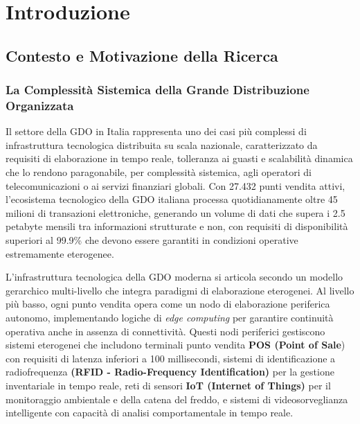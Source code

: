 \chapter{Introduzione}
\label{cap1_introduction}

\section{Contesto e Motivazione della Ricerca}

\subsection{La Complessità Sistemica della Grande Distribuzione Organizzata}

Il settore della \gls{GDO} in Italia rappresenta uno dei casi più complessi di infrastruttura tecnologica distribuita su scala nazionale, caratterizzato da requisiti di elaborazione in tempo reale, tolleranza ai guasti e scalabilità dinamica che lo rendono paragonabile, per complessità sistemica, agli operatori di telecomunicazioni o ai servizi finanziari globali. 
Con 27.432 punti vendita attivi\autocite{istat2024}, l'ecosistema tecnologico della \gls{GDO} italiana processa quotidianamente oltre 45 milioni di transazioni elettroniche, generando un volume di dati che supera i 2.5 petabyte mensili tra informazioni strutturate e non, con requisiti di disponibilità superiori al 99.9\% che devono essere garantiti in condizioni operative estremamente eterogenee.

L'infrastruttura tecnologica della GDO moderna si articola secondo un modello gerarchico multi-livello che integra paradigmi di elaborazione eterogenei. 
Al livello più basso, ogni punto vendita opera come un nodo di elaborazione periferica autonomo, implementando logiche di \textit{edge computing} per garantire continuità operativa anche in assenza di connettività. Questi nodi periferici gestiscono sistemi eterogenei che includono terminali punto vendita \textbf{\gls{POS} (Point of Sale}) con requisiti di latenza inferiori a 100 millisecondi, sistemi di identificazione a radiofrequenza \textbf{(RFID - Radio-Frequency Identification)} per la gestione inventariale in tempo reale, reti di sensori \textbf{IoT (Internet of Things)} per il monitoraggio ambientale e della catena del freddo, e sistemi di videosorveglianza intelligente con capacità di analisi comportamentale in tempo reale.

